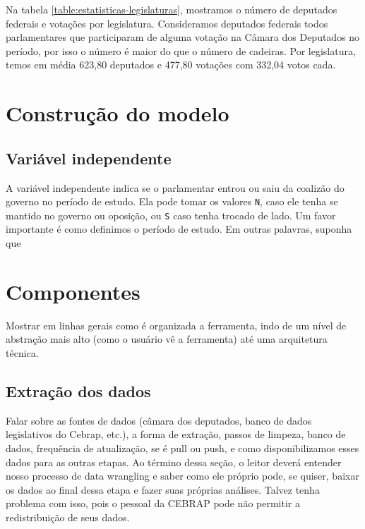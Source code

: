\documentclass[a4paper,titlepage]{ppgi}\usepackage[]{graphicx}\usepackage[]{color}
\begin{document}
Na tabela \ref{table:estatisticas-legislaturas}, mostramos o número de
deputados federais e votações por legislatura. Consideramos deputados federais
todos parlamentares que participaram de alguma votação na Câmara dos Deputados
no período, por isso o número é maior do que o número de cadeiras. Por
legislatura, temos em média 623,80 deputados e 477,80
votações com 332,04 votos cada.

\section{Construção do modelo}


\subsection{Variável independente}

A variável independente indica se o parlamentar entrou ou saiu da coalizão do
governo no período de estudo. Ela pode tomar os valores \verb|N|, caso ele
tenha se mantido no governo ou oposição, ou \verb|S| caso tenha trocado de
lado. Um favor importante é como definimos o período de estudo. Em outras
palavras, suponha que 

\section{Componentes}

Mostrar em linhas gerais como é organizada a ferramenta, indo de um nível de abstração mais alto (como o usuário vê a ferramenta) até uma arquitetura técnica.




\subsection{Extração dos dados}

Falar sobre as fontes de dados (câmara dos deputados, banco de dados legislativos do Cebrap, etc.), a forma de extração, passos de limpeza, banco de dados, frequência de atualização, se é pull ou push, e como disponibilizamos esses dados para as outras etapas. Ao término dessa seção, o leitor deverá entender nosso processo de data wrangling e saber como ele próprio pode, se quiser, baixar os dados ao final dessa etapa e fazer suas próprias análises. Talvez tenha problema com isso, pois o pessoal da CEBRAP pode não permitir a redistribuição de seus dados.
\end{document}
